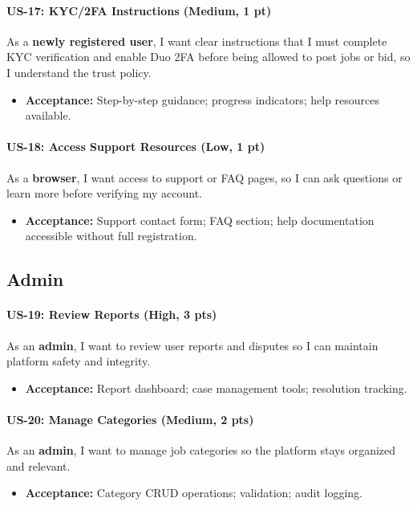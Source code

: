 \documentclass[11pt]{article}
\begin{document}
\paragraph{US-17: KYC/2FA Instructions (Medium, 1 pt)}
As a \textbf{newly registered user}, I want clear instructions that I must complete KYC verification and enable Duo 2FA before being allowed to post jobs or bid, so I understand the trust policy.
\begin{itemize}[leftmargin=1.4em]
  \item \textbf{Acceptance:} Step-by-step guidance; progress indicators; help resources available.
\end{itemize}

\paragraph{US-18: Access Support Resources (Low, 1 pt)}
As a \textbf{browser}, I want access to support or FAQ pages, so I can ask questions or learn more before verifying my account.
\begin{itemize}[leftmargin=1.4em]
  \item \textbf{Acceptance:} Support contact form; FAQ section; help documentation accessible without full registration.
\end{itemize}

\subsection*{Admin}
\paragraph{US-19: Review Reports (High, 3 pts)}
As an \textbf{admin}, I want to review user reports and disputes so I can maintain platform safety and integrity.
\begin{itemize}[leftmargin=1.4em]
  \item \textbf{Acceptance:} Report dashboard; case management tools; resolution tracking.
\end{itemize}

\paragraph{US-20: Manage Categories (Medium, 2 pts)}
As an \textbf{admin}, I want to manage job categories so the platform stays organized and relevant.
\begin{itemize}[leftmargin=1.4em]
  \item \textbf{Acceptance:} Category CRUD operations; validation; audit logging.
\end{itemize}
\end{document}
